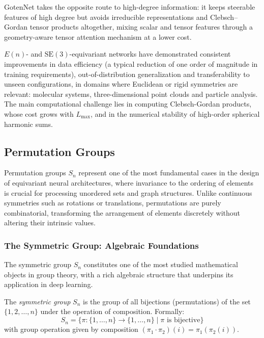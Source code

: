GotenNet \citep{aykent2025gotennet} takes the opposite route to high-degree information: it keeps steerable features of high degree but avoids irreducible representations and Clebsch--Gordan tensor products altogether, mixing scalar and tensor features through a geometry-aware tensor attention mechanism at a lower cost.

$E(n)$- and $\text{SE}(3)$-equivariant networks have demonstrated consistent improvements in data efficiency (a typical reduction of one order of magnitude in training requirements), out-of-distribution generalization and transferability to unseen configurations, in domains where Euclidean or rigid symmetries are relevant: molecular systems, three-dimensional point clouds and particle analysis. The main computational challenge lies in computing Clebsch-Gordan products, whose cost grows with $L_{\max}$, and in the numerical stability of high-order spherical harmonic sums.

\subsection{Permutation Groups}\label{subsec:grupos_permutaciones}

Permutation groups $S_n$ represent one of the most fundamental cases in the design of equivariant neural architectures, where invariance to the ordering of elements is crucial for processing unordered sets and graph structures. Unlike continuous symmetries such as rotations or translations, permutations are purely combinatorial, transforming the arrangement of elements discretely without altering their intrinsic values.

\subsubsection{The Symmetric Group: Algebraic Foundations}

The symmetric group $S_n$ constitutes one of the most studied mathematical objects in group theory, with a rich algebraic structure that underpins its application in deep learning.

\begin{definition}\label{def:symmetric_group}
The \textit{symmetric group} $S_n$ is the group of all bijections (permutations) of the set $\{1, 2, \ldots, n\}$ under the operation of composition. Formally:
\begin{equation}
S_n = \{\pi: \{1,\ldots,n\} \to \{1,\ldots,n\} \mid \pi \text{ is bijective}\}
\end{equation}
with group operation given by composition $(\pi_1 \cdot \pi_2)(i) = \pi_1(\pi_2(i))$.
\end{definition}

